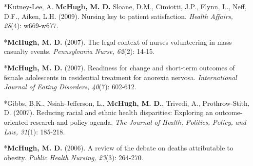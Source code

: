 \documentclass[10pt,]{article}
\begin{document}
{{{{{{{{{{{{{{\begin{hangparas}{.25in}{1}
\end{hangparas}

\vspace{4mm}

\begin{hangparas}{.25in}{1}

*Kutney-Lee, A. {\textbf {McHugh, M. D.}} Sloane, D.M., Cimiotti, J.P., Flynn, L., Neff, D.F., Aiken, L.H. (2009). Nursing key to patient satisfaction. {\textit {Health Affairs, 28}}(4): w669-w677.

\end{hangparas}

\vspace{4mm}

\begin{hangparas}{.25in}{1}

*{\textbf {McHugh, M. D.}} (2007). The legal context of nurses volunteering in mass casualty events. {\textit {Pennsylvania Nurse, 62}}(2): 14-15.

\end{hangparas}

\vspace{4mm}

\begin{hangparas}{.25in}{1}

*{\textbf {McHugh, M. D.}} (2007). Readiness for change and short-term outcomes of female adolescents in residential treatment for anorexia nervosa. {\textit {International Journal of Eating Disorders, 40}}(7): 602-612.

\end{hangparas}

\vspace{4mm}

\begin{hangparas}{.25in}{1}

*Gibbs, B.K., Nsiah-Jefferson, L., {\textbf {McHugh, M. D.}}, Trivedi, A., Prothrow-Stith, D. (2007). Reducing racial and ethnic health disparities: Exploring an outcome-oriented research and policy agenda. {\textit {The Journal of Health, Politics, Policy, and Law, 31}}(1): 185-218.

\end{hangparas}

\vspace{4mm}

\begin{hangparas}{.25in}{1}

*{\textbf {McHugh, M. D.}} (2006). A review of the debate on deaths attributable to obesity. {\textit {Public Health Nursing, 23}}(3): 264-270.


\end{hangparas}}}}}}}}}}}}}}}
\end{document}
